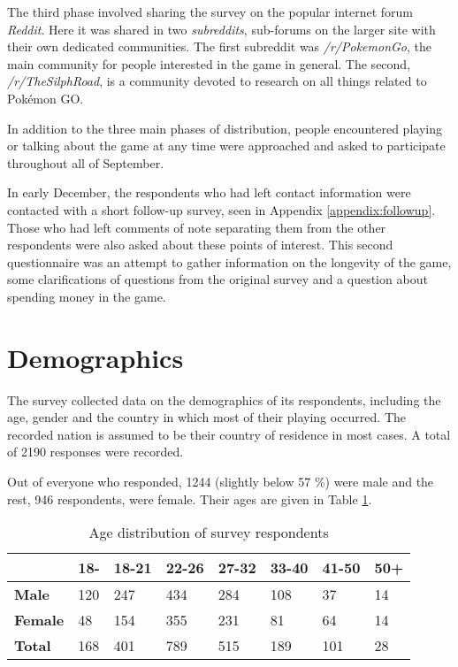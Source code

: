 The third phase involved sharing the survey on the popular internet forum \emph{Reddit}. Here it was shared in two \emph{subreddits}, sub-forums on the larger site with their own dedicated communities. The first subreddit was \emph{/r/PokemonGo}, the main community for people interested in the game in general. The second, \emph{/r/TheSilphRoad}, is a community devoted to research on all things related to Pokémon GO.

In addition to the three main phases of distribution, people encountered playing or talking about the game at any time were approached and asked to participate throughout all of September.

In early December, the respondents who had left contact information were contacted with a short follow-up survey, seen in Appendix \ref{appendix:followup}. Those who had left comments of note separating them from the other respondents were also asked about these points of interest. This second questionnaire was an attempt to gather information on the longevity of the game, some clarifications of questions from the original survey and a question about spending money in the game. 


\section{Demographics}

The survey collected data on the demographics of its respondents, including the age, gender and the country in which most of their playing occurred. The recorded nation is assumed to be their country of residence in most cases. A total of 2190 responses were recorded.

Out of everyone who responded, 1244 (slightly below 57 \%) were male and the rest, 946 respondents, were female. Their ages are given in Table \ref{tbl:survey-age-distribution}.

\begin{table}[h]
	\centering
	\label{tbl:survey-age-distribution}
	\begin{tabularx}{\textwidth}{|X||X|X|X|X|X|X|X|}
		\hline
		&\textbf{18-} & \textbf{18-21} & \textbf{22-26} & \textbf{27-32} & \textbf{33-40} & \textbf{41-50} & \textbf{50+}\\
		\hline\hline
		
		\textbf{Male} & 120 & 247 & 434 & 284 & 108 & 37 & 14 \\
		\hline
		
		\textbf{Female} & 48 & 154 & 355 & 231 & 81 & 64 & 14 \\
		\hline
		
		\textbf{Total} & 168 & 401 & 789 & 515 & 189 & 101 & 28 \\
		\hline
	\end{tabularx}
	\caption{Age distribution of survey respondents}
\end{table}

